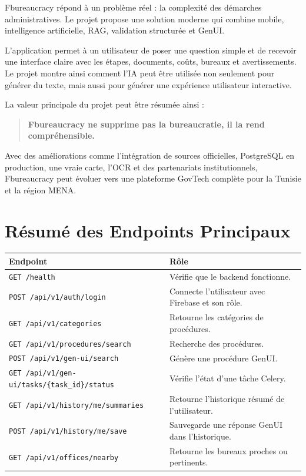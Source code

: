 \documentclass[12pt,a4paper]{report}
\begin{document}
Fbureaucracy répond à un problème réel : la complexité des démarches administratives. Le projet propose une solution moderne qui combine mobile, intelligence artificielle, RAG, validation structurée et GenUI.

L'application permet à un utilisateur de poser une question simple et de recevoir une interface claire avec les étapes, documents, coûts, bureaux et avertissements. Le projet montre ainsi comment l'IA peut être utilisée non seulement pour générer du texte, mais aussi pour générer une expérience utilisateur interactive.

La valeur principale du projet peut être résumée ainsi :

\begin{quote}
\textbf{Fbureaucracy ne supprime pas la bureaucratie, il la rend compréhensible.}
\end{quote}

Avec des améliorations comme l'intégration de sources officielles, PostgreSQL en production, une vraie carte, l'OCR et des partenariats institutionnels, Fbureaucracy peut évoluer vers une plateforme GovTech complète pour la Tunisie et la région MENA.


\appendix

\chapter{Résumé des Endpoints Principaux}

\begin{longtable}{|p{4cm}|p{10cm}|}
\hline
\textbf{Endpoint} & \textbf{Rôle} \\
\hline
\endhead
\texttt{GET /health} & Vérifie que le backend fonctionne. \\
\hline
\texttt{POST /api/v1/auth/login} & Connecte l'utilisateur avec Firebase et son rôle. \\
\hline
\texttt{GET /api/v1/categories} & Retourne les catégories de procédures. \\
\hline
\texttt{GET /api/v1/procedures/search} & Recherche des procédures. \\
\hline
\texttt{POST /api/v1/gen-ui/search} & Génère une procédure GenUI. \\
\hline
\texttt{GET /api/v1/gen-ui/tasks/\{task\_id\}/status} & Vérifie l'état d'une tâche Celery. \\
\hline
\texttt{GET /api/v1/history/me/summaries} & Retourne l'historique résumé de l'utilisateur. \\
\hline
\texttt{POST /api/v1/history/me/save} & Sauvegarde une réponse GenUI dans l'historique. \\
\hline
\texttt{GET /api/v1/offices/nearby} & Retourne les bureaux proches ou pertinents. \\
\hline
\end{longtable}
\end{document}

